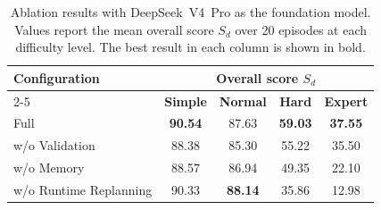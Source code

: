 \begin{table}[!t]
    \centering
    \caption{Ablation results with DeepSeek~V4~Pro as the foundation model.
    Values report the mean overall score $S_d$ over 20 episodes at each
    difficulty level. The best result in each column is shown in bold.}
    \label{tab:ablation-results}
    \footnotesize
    \setlength{\tabcolsep}{7pt}
    \renewcommand{\arraystretch}{1.15}
    \begin{tabular}{@{}lcccc@{}}
        \toprule
        \multirow{2}{*}{\textbf{Configuration}}
        & \multicolumn{4}{c}{\textbf{Overall score $S_d$}} \\
        \cmidrule(l){2-5}
        & \textbf{Simple} & \textbf{Normal} & \textbf{Hard} & \textbf{Expert} \\
        \midrule
        Full
        & \textbf{90.54} & 87.63 & \textbf{59.03} & \textbf{37.55} \\
        w/o Validation
        & 88.38 & 85.30 & 55.22 & 35.50 \\
        w/o Memory
        & 88.57 & 86.94 & 49.35 & 22.10 \\
        w/o Runtime Replanning
        & 90.33 & \textbf{88.14} & 35.86 & 12.98 \\
        \bottomrule
    \end{tabular}
\end{table}
